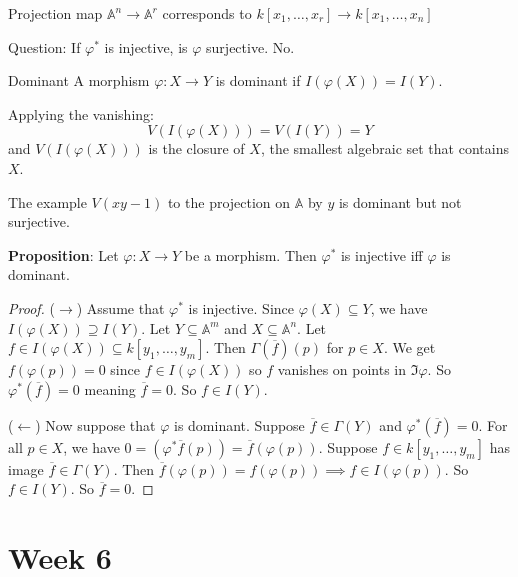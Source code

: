 \documentclass{report}
\begin{document}
\begin{examples}
    \begin{example}
        Projection map $\mathbb{A}^{n} \rightarrow \mathbb{A}^{r}$ corresponds to $k[x_{1}, \ldots , x_{r}] \rightarrow k[x_{1}, \ldots , x_{n}]$ 
    \end{example}
\end{examples}

Question: If $\varphi^{*}$ is injective, is $\varphi$ surjective. No.

\begin{definition}{Dominant}
    A morphism $\varphi : X \rightarrow Y$ is dominant if $I(\varphi(X)) = I(Y)$.
\end{definition}

Applying the vanishing:
    \begin{equation*}
        V(I(\varphi(X))) = V(I(Y)) = Y
    \end{equation*}
and $V(I(\varphi(X)))$ is the closure of $X$, the smallest algebraic set that contains $X$.

The example $V(xy - 1)$ to the projection on $\mathbb{A}$ by $y$ is dominant but not surjective.

\textbf{Proposition}: Let $\varphi : X \rightarrow Y$ be a morphism. Then $\varphi^{*}$ is injective iff $\varphi$ is dominant.
    \begin{proof}
        ($\rightarrow $) Assume that $\varphi^{*}$ is injective. Since $\varphi(X) \subseteq Y$, we have $I(\varphi(X)) \supseteq I(Y)$. Let $Y \subseteq \mathbb{A}^{m}$ and $X \subseteq \mathbb{A}^{n}$. Let $f \in I(\varphi(X)) \subseteq k[y_{1}, \ldots , y_{m}]$. Then $\Gamma(\overline{f})(p)$ for $p \in X$. We get $f(\varphi(p)) = 0$ since $f \in I(\varphi(X))$ so $f$ vanishes on points in $\Im{\varphi}$. So $\varphi^{*}(\overline{f}) = 0$ meaning $\overline{f} = 0$. So $f \in I(Y)$.

        ($\leftarrow $) Now suppose that $\varphi$ is dominant. Suppose $\overline{f} \in \Gamma(Y)$ and $\varphi^{*}(\overline{f}) = 0$. For all $p \in X$, we have $0 = (\varphi^{*}\overline{f}(p)) = \overline{f}(\varphi(p))$. Suppose $f \in k[y_{1}, \ldots , y_{m}]$ has image $\overline{f} \in \Gamma(Y)$. Then $\overline{f}(\varphi(p)) = f(\varphi(p)) \implies f \in I(\varphi(p))$. So $f \in I(Y)$. So $\overline{f}= 0$. 
    \end{proof} 

\chapter{Week 6}
\end{document}
